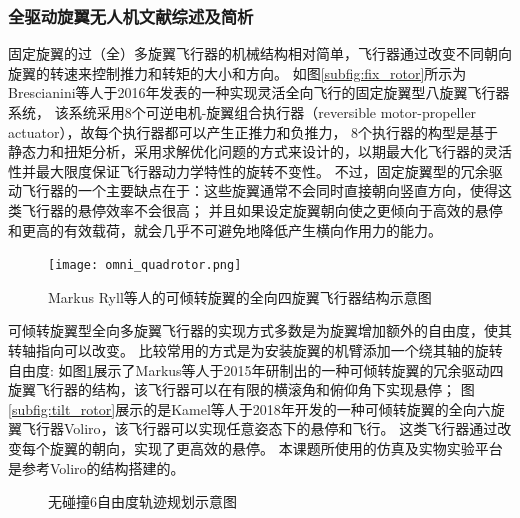 \subsubsection{全驱动旋翼无人机文献综述及简析}
固定旋翼的过（全）多旋翼飞行器的机械结构相对简单，飞行器通过改变不同朝向旋翼的转速来控制推力和转矩的大小和方向。
如图\ref{subfig:fix_rotor}所示为Brescianini等人于2016年发表的一种实现灵活全向飞行的固定旋翼型八旋翼飞行器系统\cite{brescianini2016design}，
该系统采用8个可逆电机-旋翼组合执行器（reversible motor-propeller actuator），故每个执行器都可以产生正推力和负推力，
8个执行器的构型是基于静态力和扭矩分析，采用求解优化问题的方式来设计的，以期最大化飞行器的灵活性并最大限度保证飞行器动力学特性的旋转不变性。
不过，固定旋翼型的冗余驱动飞行器的一个主要缺点在于：这些旋翼通常不会同时直接朝向竖直方向，使得这类飞行器的悬停效率不会很高；
并且如果设定旋翼朝向使之更倾向于高效的悬停和更高的有效载荷，就会几乎不可避免地降低产生横向作用力的能力\cite{allenspach2020design}。

\begin{figure}[ht]
    \centering
    \texttt{[image: omni\_quadrotor.png]}
    \caption{Markus Ryll等人的可倾转旋翼的全向四旋翼飞行器结构示意图}
    \label{fig:tiltrotor_quadrotor}
\end{figure}

可倾转旋翼型全向多旋翼飞行器的实现方式多数是为旋翼增加额外的自由度，使其转轴指向可以改变。
比较常用的方式是为安装旋翼的机臂添加一个绕其轴的旋转自由度:
如图\ref{fig:tiltrotor_quadrotor}展示了Markus等人于2015年研制出的一种可倾转旋翼的冗余驱动四旋翼飞行器的结构\cite{ryll2014novel}，该飞行器可以在有限的横滚角和俯仰角下实现悬停；
图\ref{subfig:tilt_rotor}展示的是Kamel等人于2018年开发的一种可倾转旋翼的全向六旋翼飞行器Voliro\cite{kamel2018voliro}，该飞行器可以实现任意姿态下的悬停和飞行。
这类飞行器通过改变每个旋翼的朝向，实现了更高效的悬停。
本课题所使用的仿真及实物实验平台是参考Voliro的结构搭建的。

\begin{figure}[!ht]
    \setlength{\subfigcapskip}{-1bp}
    \centering
    \begin{minipage}{\textwidth}

    \centering
    \subfigure{\label{subfig:trajectory_overview}}\addtocounter{subfigure}{-2}
    \subfigure{\label{subfig:simulation}}\addtocounter{subfigure}{-2}

    \end{minipage}
    \caption{无碰撞6自由度轨迹规划示意图\cite{liu2022collision}}
    \label{fig:collision_free_6dof_trajectory}
\end{figure}

